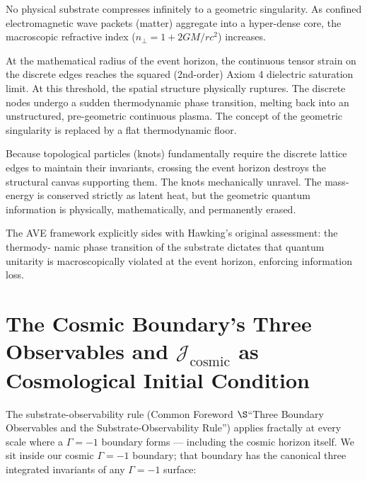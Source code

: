 No physical substrate compresses infinitely to a geometric singularity. As confined electromagnetic wave packets (matter) aggregate into a hyper-dense core, the macroscopic refractive index ($n_{\perp}=1+2GM/rc^{2}$) increases.

At the mathematical radius of the event horizon, the continuous tensor strain on
the discrete edges reaches the squared (2nd-order) Axiom 4 dielectric saturation limit. At this
threshold, the spatial structure physically ruptures. The discrete nodes undergo a sudden
thermodynamic phase transition, melting back into an unstructured, pre-geometric continuous
plasma. The concept of the geometric singularity is replaced by a flat thermodynamic floor.

Because topological particles (knots) fundamentally require the discrete lattice edges to
maintain their invariants, crossing the event horizon destroys the structural canvas supporting
them. The knots mechanically unravel. The mass-energy is conserved strictly as latent heat,
but the geometric quantum information is physically, mathematically, and permanently erased.

The AVE framework explicitly sides with Hawking's original assessment: the thermody-
namic phase transition of the substrate dictates that quantum unitarity is macroscopically
violated at the event horizon, enforcing information loss.

\section{The Cosmic Boundary's Three Observables and $\mathcal{J}_{\text{cosmic}}$ as Cosmological Initial Condition}
\label{sec:cosmic_J_as_IC}

The substrate-observability rule (Common Foreword $\S$``Three Boundary
Observables and the Substrate-Observability Rule'') applies fractally
at every scale where a $\Gamma = -1$\gammaundeclared{} boundary forms --- including the cosmic
horizon itself. We sit inside our cosmic $\Gamma = -1$\gammaundeclared{} boundary; that boundary
has the canonical three integrated invariants of any $\Gamma = -1$\gammaundeclared{} surface:

